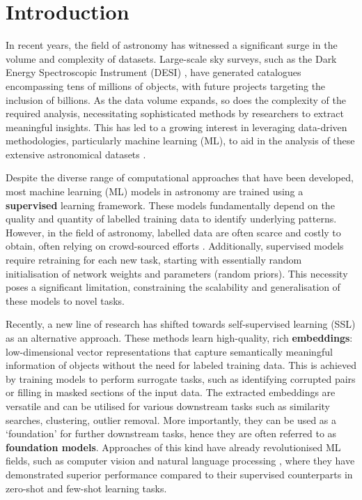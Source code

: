\documentclass[a4paper,12pt]{article}
\begin{document}
\section{Introduction}

In recent years, the field of astronomy has witnessed a significant surge in the volume and complexity of datasets. Large-scale sky surveys, such as the Dark Energy Spectroscopic Instrument (DESI) \cite{DESI}, have generated catalogues encompassing tens of millions of objects, with future projects targeting the inclusion of billions. As the data volume expands, so does the complexity of the required analysis, necessitating sophisticated methods by researchers to extract meaningful insights. This has led to a growing interest in leveraging data-driven methodologies, particularly machine learning (ML), to aid in the analysis of these extensive astronomical datasets \cite{ivezic2020statistics}.

Despite the diverse range of computational approaches that have been developed, most machine learning (ML) models in astronomy are trained using a \textbf{supervised} learning framework. These models fundamentally depend on the quality and quantity of labelled training data to identify underlying patterns. However, in the field of astronomy, labelled data are often scarce and costly to obtain, often relying on crowd-sourced efforts \cite{willett2013galaxy}. Additionally, supervised models require retraining for each new task, starting with essentially random initialisation of network weights and parameters (random priors). This necessity poses a significant limitation, constraining the scalability and generalisation of these models to novel tasks.

Recently, a new line of research has shifted towards self-supervised learning (SSL) as an alternative approach. These methods learn high-quality, rich \textbf{embeddings}: low-dimensional vector representations that capture semantically meaningful information of objects without the need for labeled training data. This is achieved by training models to perform surrogate tasks, such as identifying corrupted pairs or filling in masked sections of the input data. The extracted embeddings are versatile and can be utilised for various downstream tasks such as similarity searches, clustering, outlier removal. More importantly, they can be used as a `foundation' for further downstream tasks, hence they are often referred to as \textbf{foundation models}.  Approaches of this kind have already revolutionised ML fields, such as computer vision \cite{he2021maskedautoencodersscalablevision} and natural language processing \cite{radford2019language}, where they have demonstrated superior performance compared to their supervised counterparts in zero-shot and few-shot learning tasks.
\end{document}
